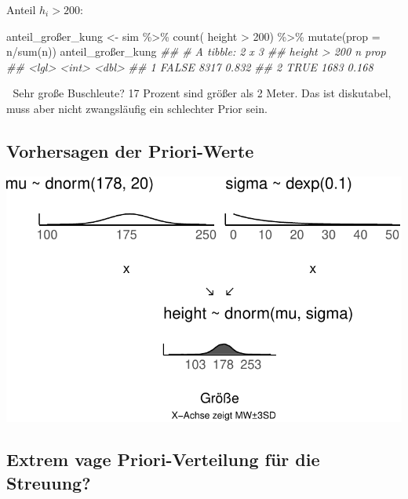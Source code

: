 \documentclass[
  a4paper,
  DIV=11]{scrreprt}
\newenvironment{Shaded}{\begin{snugshade}}{\end{snugshade}}
\newcommand{\AttributeTok}[1]{\textcolor[rgb]{0.40,0.45,0.13}{#1}}
\newcommand{\DecValTok}[1]{\textcolor[rgb]{0.68,0.00,0.00}{#1}}
\newcommand{\DocumentationTok}[1]{\textcolor[rgb]{0.37,0.37,0.37}{\textit{#1}}}
\newcommand{\FunctionTok}[1]{\textcolor[rgb]{0.28,0.35,0.67}{#1}}
\newcommand{\NormalTok}[1]{\textcolor[rgb]{0.00,0.23,0.31}{#1}}
\newcommand{\OtherTok}[1]{\textcolor[rgb]{0.00,0.23,0.31}{#1}}
\newcommand{\SpecialCharTok}[1]{\textcolor[rgb]{0.37,0.37,0.37}{#1}}
\theoremstyle{definition}
\theoremstyle{remark}
\begin{document}
Anteil \(h_i > 200\):

\begin{Shaded}
\begin{Highlighting}[]
\NormalTok{anteil\_großer\_kung }\OtherTok{\textless{}{-}} 
\NormalTok{sim }\SpecialCharTok{\%\textgreater{}\%} 
  \FunctionTok{count}\NormalTok{( height }\SpecialCharTok{\textgreater{}} \DecValTok{200}\NormalTok{) }\SpecialCharTok{\%\textgreater{}\%} 
  \FunctionTok{mutate}\NormalTok{(}\AttributeTok{prop =}\NormalTok{ n}\SpecialCharTok{/}\FunctionTok{sum}\NormalTok{(n))}
\NormalTok{anteil\_großer\_kung}
\DocumentationTok{\#\# \# A tibble: 2 x 3}
\DocumentationTok{\#\#   \textasciigrave{}height \textgreater{} 200\textasciigrave{}     n  prop}
\DocumentationTok{\#\#   \textless{}lgl\textgreater{}          \textless{}int\textgreater{} \textless{}dbl\textgreater{}}
\DocumentationTok{\#\# 1 FALSE           8317 0.832}
\DocumentationTok{\#\# 2 TRUE            1683 0.168}
\end{Highlighting}
\end{Shaded}

🤔 Sehr große Buschleute? 17 Prozent sind größer als 2 Meter. Das ist
diskutabel, muss aber nicht zwangsläufig ein schlechter Prior sein.

\hypertarget{vorhersagen-der-priori-werte}{%
\subsection{Vorhersagen der
Priori-Werte}\label{vorhersagen-der-priori-werte}}

\includegraphics{./gauss_files/figure-pdf/Kung-15-1.pdf}

\hypertarget{extrem-vage-priori-verteilung-fuxfcr-die-streuung}{%
\subsection{Extrem vage Priori-Verteilung für die
Streuung?}\label{extrem-vage-priori-verteilung-fuxfcr-die-streuung}}
\end{document}
